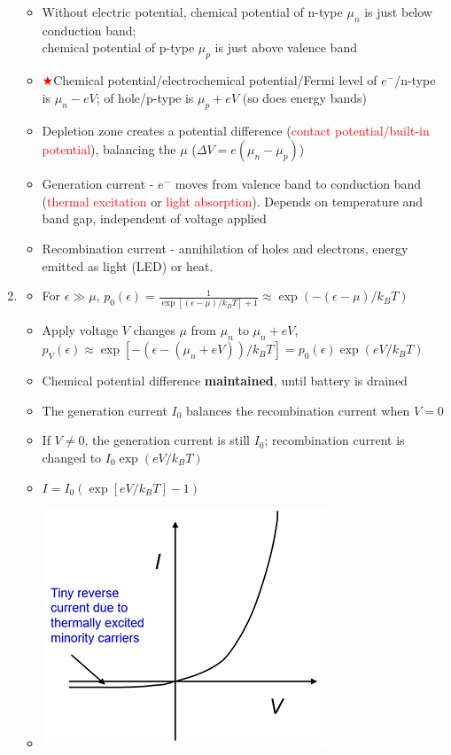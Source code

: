 \documentclass{article}
\theoremstyle{remark}
\theoremstyle{remark}
\begin{document}
\begin{enumerate}
\begin{itemize}
            \item Without electric potential, chemical potential of n-type $\mu_n$ is just below conduction band;\\
                chemical potential of p-type $\mu_p$ is just above valence band
            \item \textcolor{red}{$\bigstar$}Chemical potential/electrochemical potential/Fermi level of $e^-$/n-type is $\mu_n-eV$; of hole/p-type is $\mu_p+eV$ (so does energy bands)
            \item Depletion zone creates a potential difference (\textcolor{red}{contact potential/built-in potential}), balancing the $\mu$ ($\Delta V=e(\mu_n-\mu_p)$)
            \item Generation current - $e^-$ moves from valence band to conduction band (\textcolor{red}{thermal excitation} or \textcolor{red}{light absorption}).
                Depends on temperature and band gap, independent of voltage applied
            \item Recombination current - annihilation of holes and electrons, energy emitted as light (LED) or heat.
        \end{itemize}
    \item \begin{itemize}
        \item For $\epsilon\gg\mu$, $p_0(\epsilon) = \frac{1}{\exp[(\epsilon-\mu)/k_B T]+1} \approx \exp(-(\epsilon-\mu)/k_BT)$
        \item Apply voltage $V$ changes $\mu$ from $\mu_n$ to $\mu_n+eV$, $p_V(\epsilon)\approx \exp[-(\epsilon-(\mu_n+eV))/k_BT] = p_0(\epsilon)\exp(eV/k_BT)$
        \item Chemical potential difference \textbf{maintained}, until battery is drained
        \item The generation current $I_0$ balances the recombination current when $V=0$
        \item If $V\neq 0$, the generation current is still $I_0$; recombination current is changed to $I_0\exp(eV/k_BT)$
        \item $\boxed{I=I_0(\exp[eV/k_BT]-1)}$
        \item \includegraphics*[width=0.4\linewidth]{cmp_semiconductor_IV.png}

\end{itemize}
\end{enumerate}
\end{document}

